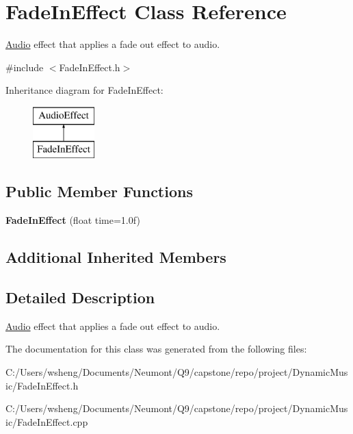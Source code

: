 \hypertarget{class_fade_in_effect}{}\section{Fade\+In\+Effect Class Reference}
\label{class_fade_in_effect}


\hyperlink{class_audio}{Audio} effect that applies a fade out effect to audio.  




{\ttfamily \#include $<$Fade\+In\+Effect.\+h$>$}

Inheritance diagram for Fade\+In\+Effect\+:\begin{figure}[H]
\begin{center}
\leavevmode
\includegraphics[height=2.000000cm]{class_fade_in_effect}
\end{center}
\end{figure}
\subsection*{Public Member Functions}
\begin{DoxyCompactItemize}
\item 
\mbox{\label{class_fade_in_effect_a5899b6e349fbdfb0c4af9d44a20e47e5}} 
{\bfseries Fade\+In\+Effect} (float time=1.\+0f)
\end{DoxyCompactItemize}
\subsection*{Additional Inherited Members}


\subsection{Detailed Description}
\hyperlink{class_audio}{Audio} effect that applies a fade out effect to audio. 

The documentation for this class was generated from the following files\+:\begin{DoxyCompactItemize}
\item 
C\+:/\+Users/wsheng/\+Documents/\+Neumont/\+Q9/capstone/repo/project/\+Dynamic\+Music/Fade\+In\+Effect.\+h\item 
C\+:/\+Users/wsheng/\+Documents/\+Neumont/\+Q9/capstone/repo/project/\+Dynamic\+Music/Fade\+In\+Effect.\+cpp\end{DoxyCompactItemize}
